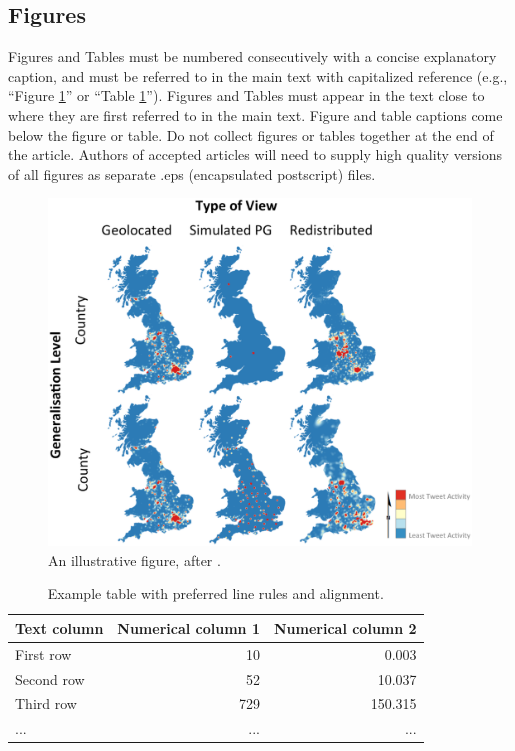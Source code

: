 \documentclass{josis}
\begin{document}
\subsection{Figures}
Figures and Tables must be numbered consecutively with a concise explanatory caption, and must be referred to in the main text with capitalized reference (e.g., ``Figure \ref{fig:1}'' or ``Table \ref{tab:1}''). Figures and Tables must appear in the text close to where they are first referred to in the main text. Figure and table captions come below the figure or table. Do not collect figures or tables together at the end of the article. Authors of accepted articles will need to supply high quality versions of all figures as separate .eps (encapsulated postscript) files.  

\begin{figure}[tbh]
\centering
\includegraphics[width=\textwidth]{Figure1}
\caption{An illustrative figure, after \cite{huck15.JOSIS}.}\label{fig:1}
\end{figure}

\begin{table}
\centering
\begin{tabular}{lrr}
\hline
Text column & Numerical column 1 & Numerical column 2\\
\hline
First row& 10 & 0.003\\
Second row& 52& 10.037\\
Third row& 729 & 150.315\\
...& ...& ...\\
\hline
\end{tabular}
\caption{Example table with preferred line rules and alignment.}\label{tab:1}
\end{table}
\end{document}
